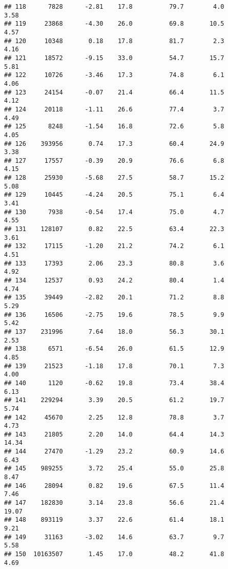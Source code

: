 \documentclass[
]{article}
\begin{document}
\begin{verbatim}
## 118      7828      -2.81    17.8          79.7        4.0              3.58
## 119     23868      -4.30    26.0          69.8       10.5              4.57
## 120     10348       0.18    17.8          81.7        2.3              4.16
## 121     18572      -9.15    33.0          54.7       15.7              5.81
## 122     10726      -3.46    17.3          74.8        6.1              4.06
## 123     24154      -0.07    21.4          66.4       11.5              4.12
## 124     20118      -1.11    26.6          77.4        3.7              4.49
## 125      8248      -1.54    16.8          72.6        5.8              4.05
## 126    393956       0.74    17.3          60.4       24.9              3.38
## 127     17557      -0.39    20.9          76.6        6.8              4.15
## 128     25930      -5.68    27.5          58.7       15.2              5.08
## 129     10445      -4.24    20.5          75.1        6.4              3.41
## 130      7938      -0.54    17.4          75.0        4.7              4.55
## 131    128107       0.82    22.5          63.4       22.3              3.61
## 132     17115      -1.20    21.2          74.2        6.1              4.51
## 133     17393       2.06    23.3          80.8        3.6              4.92
## 134     12537       0.93    24.2          80.4        1.4              4.74
## 135     39449      -2.82    20.1          71.2        8.8              5.29
## 136     16506      -2.75    19.6          78.5        9.9              5.42
## 137    231996       7.64    18.0          56.3       30.1              2.53
## 138      6571      -6.54    26.0          61.5       12.9              4.85
## 139     21523      -1.18    17.8          70.1        7.3              4.00
## 140      1120      -0.62    19.8          73.4       38.4              6.13
## 141    229294       3.39    20.5          61.2       19.7              5.74
## 142     45670       2.25    12.8          78.8        3.7              4.73
## 143     21805       2.20    14.0          64.4       14.3             14.34
## 144     27470      -1.29    23.2          60.9       14.6              6.43
## 145    989255       3.72    25.4          55.0       25.8              8.47
## 146     28094       0.82    19.6          67.5       11.4              7.46
## 147    182830       3.14    23.8          56.6       21.4             19.07
## 148    893119       3.37    22.6          61.4       18.1              9.21
## 149     31163      -3.02    14.6          63.7        9.7              5.58
## 150  10163507       1.45    17.0          48.2       41.8              4.69

\end{verbatim}
\end{document}
